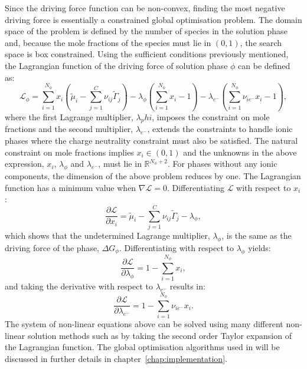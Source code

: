 Since the driving force function can be non-convex, finding the most negative driving force is essentially a constrained global optimisation problem. The domain space of  the problem is defined by the number of species in the solution phase and, because the mole fractions of the species must lie in $(0,1)$, the search space is box constrained. Using the sufficient conditions previously mentioned, the Lagrangian function of the driving force of solution phase $\phi$ can be defined as:
	\begin{equation}\label{eq:DrivingForceLagrangian}
		\mathcal{L}_\phi = \sum_{i=1}^{N_\phi} x_i \left(\tilde{\mu}_i - \sum_{j=1}^{C} \nu_{ij} \tilde{\Gamma}_j \right)
						 - \lambda_\phi \left( \sum_{i=1}^{N_\phi} x_i - 1 \right)
						 - \lambda_{e^-} \left( \sum_{i=1}^{N_\phi} \nu_{i {e^-}} x_i - 1 \right),
	\end{equation}
	where the first Lagrange multiplier, $\lambda_phi$, imposes the constraint on mole fractions and the second multiplier, $\lambda_{e^-}$, extends the constraints to handle ionic phases where the charge neutrality constraint must also be satisfied. The natural constraint on mole fractions implies $x_i \in (0, 1)$ and the  unknowns in the above expression, $x_i$, $\lambda_\phi$ and $\lambda_{e^-}$, must lie in $\mathbb{R}^{N_\phi + 2}$. For phases without any ionic components, the dimension of the above problem reduces by one.  The Lagrangian function has a minimum value when $\nabla \mathcal{L} = 0$. Differentiating $\mathcal{L}$ with respect to $x_i$:
	\begin{equation}
		\frac{\partial \mathcal{L}}{\partial x_i}	= \tilde{\mu}_i -  \sum_{j=1}^{C} \nu_{ij} \tilde{\Gamma}_j - \lambda_\phi,
	\end{equation}
	which shows that the undetermined Lagrange multiplier, $\lambda_\phi$, is the same as the driving force of the phase, $\Delta G_\phi$. Differentiating with respect to $\lambda_\phi$ yields:
	\begin{equation}
		\frac{\partial \mathcal{L}}{\partial \lambda_\phi}	= 1 - \sum_{i=1}^{N_\phi} x_i,
	\end{equation}
	and taking the derivative with respect to $\lambda_{e^-}$ results in:
	\begin{equation}
		\frac{\partial \mathcal{L}}{\partial \lambda_{e^-}}	= 1 - \sum_{i=1}^{N_\phi} \nu_{i {e^-}} x_i.
	\end{equation}
	The system of non-linear equations above can be solved using many different non-linear solution methods such as by taking the second order Taylor expansion of the Lagrangian function. The global optimisation algorithms used in {\GEM} will be discussed in further details in chapter~\ref{chap:implementation}.

